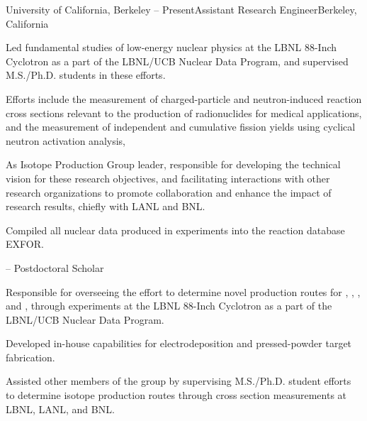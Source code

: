 \begin{rSubsection}{University of California, Berkeley}{ -- Present}{Assistant Research Engineer}{Berkeley, California}
\item Led fundamental studies of low-energy nuclear physics at the LBNL 88-Inch Cyclotron as a part of the LBNL/UCB Nuclear Data Program,  and supervised M.S./Ph.D. students in these efforts.
\item Efforts include the measurement of charged-particle and neutron-induced reaction cross sections relevant to the production of radionuclides for medical applications, and the measurement of independent and cumulative fission yields using cyclical neutron activation analysis,
\item As  Isotope Production Group leader, responsible for developing the technical vision for these research objectives, 
and facilitating interactions with other research organizations  to promote collaboration and enhance the impact of research results, chiefly with LANL and BNL. 
\item Compiled all nuclear data produced in  experiments into the reaction database EXFOR. 
\end{rSubsection}\vspace{-1.5\baselineskip}
\begin{rSubsection}{}{ -- }{Postdoctoral Scholar}{}
\item Responsible for overseeing the effort to determine novel production routes for , , , and , through experiments at the LBNL 88-Inch Cyclotron as a part of the LBNL/UCB Nuclear Data Program.
\item Developed in-house capabilities for electrodeposition and  pressed-powder target fabrication.
\item Assisted other members of the group by supervising M.S./Ph.D. student efforts to determine isotope production routes through cross section measurements at LBNL, LANL, and BNL.
\end{rSubsection}\vspace{-1.5\baselineskip}
